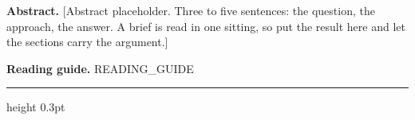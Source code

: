 \noindent\textbf{Abstract.}
[Abstract placeholder. Three to five sentences: the question, the approach, the answer. A brief is read in one sitting, so put the result here and let the sections carry the argument.]

\vspace{6pt}
\noindent\small\textbf{Reading guide.} {{READING_GUIDE}}
\normalsize
\vspace{4pt}
{\color{hair}\hrule height 0.3pt}
\vspace{6pt}
